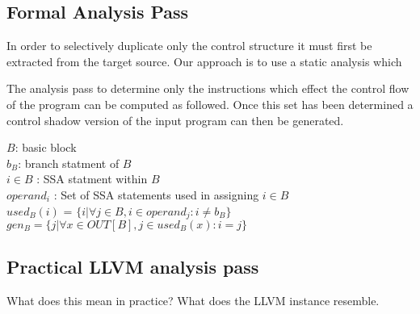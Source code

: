 
\subsection{Formal Analysis Pass}

In order to selectively duplicate only the control structure it must
first be extracted from the target source. Our approach is to use a 
static analysis which 

The analysis pass to determine only the instructions which effect the
control flow of the program can be computed as followed. 
Once this set has been determined a control shadow version of the input
program can then be generated. 


\noindent $B$: basic block\\
$b_B$: branch statment of $B$\\
$i \in B$ : SSA statment within $B$\\
$operand_i$ : Set of SSA statements used in assigning $i\in B$\\

\noindent$used_B(i)$ = $\{i|\forall j \in B, i \in operand_j : i \ne b_B\}$ \\%
$gen_B = \{j|\forall x \in OUT[B], j \in used_B(x) : i = j\}$


\subsection{Practical LLVM analysis pass}
What does this mean in practice? What does the LLVM instance resemble.
